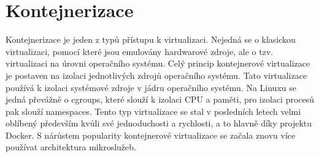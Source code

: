 \chapter{Kontejnerizace} 
Kontejnerizace je jeden z typů přístupu k virtualizaci. Nejedná se o klasickou virtualizaci, pomocí které jsou emulovány hardwarové zdroje, ale o tzv. virtualizaci na úrovni operačního systému. Celý princip kontejnerové virtualizace je postaven na izolaci jednotlivých zdrojů operačního systému. Tato virtualizace používá k izolaci systémové zdroje v jádru operačního systému. Na Linuxu se jedná převážně o cgroups, které slouží k izolaci CPU a paměti, pro izolaci procesů pak slouží namespaces. Tento typ virtualizace se stal v posledních letech velmi oblíbený především kvůli své jednoduchosti a rychlosti, a to hlavně díky projektu Docker. S nárůstem popularity kontejnerové virtualizace se začala znovu více používat architektura mikroslužeb.


